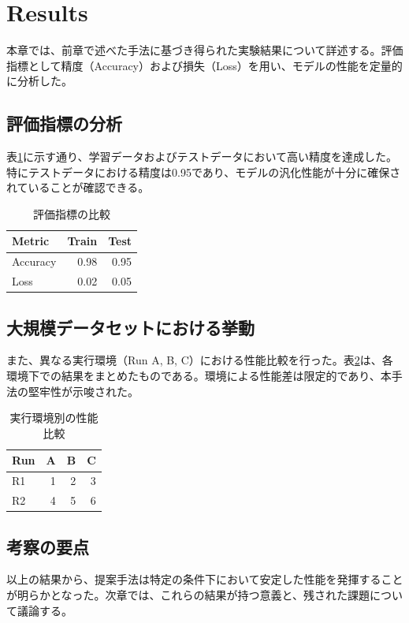 \section{Results}\label{sec:results}
本章では、前章で述べた手法に基づき得られた実験結果について詳述する。評価指標として精度（Accuracy）および損失（Loss）を用い、モデルの性能を定量的に分析した。

\subsection{評価指標の分析}
表\ref{tab:metrics}に示す通り、学習データおよびテストデータにおいて高い精度を達成した。特にテストデータにおける精度は0.95であり、モデルの汎化性能が十分に確保されていることが確認できる。

\begin{table}[htbp]
\centering
\begin{tabular}{lrr}
\toprule
Metric & Train & Test \\
\midrule
Accuracy & 0.98 & 0.95 \\
Loss & 0.02 & 0.05 \\
\bottomrule
\end{tabular}
\caption{評価指標の比較}
\label{tab:metrics}
\end{table}

\subsection{大規模データセットにおける挙動}
また、異なる実行環境（Run A, B, C）における性能比較を行った。表\ref{tab:wide}は、各環境下での結果をまとめたものである。環境による性能差は限定的であり、本手法の堅牢性が示唆された。

\begin{table}[htbp]
\centering
\begin{tabular}{lrrr}
\toprule
Run & A & B & C \\
\midrule
R1 & 1 & 2 & 3 \\
R2 & 4 & 5 & 6 \\
\bottomrule
\end{tabular}
\caption{実行環境別の性能比較}
\label{tab:wide}
\end{table}

\subsection{考察の要点}
以上の結果から、提案手法は特定の条件下において安定した性能を発揮することが明らかとなった。次章では、これらの結果が持つ意義と、残された課題について議論する。
